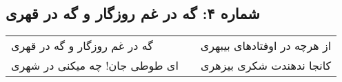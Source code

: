 \begin{center}
\section*{شماره ۴: گه در غم روزگار و گه در قهری}
\label{sec:004}
\begin{longtable}{l p{0.5cm} r}
گه در غم روزگار و گه در قهری
&&
از هرچه در اوفتادهای بیبهری
\\
ای طوطی جان! چه میکنی در شهری
&&
کانجا ندهندت شکری بیزهری
\\
\end{longtable}
\end{center}
